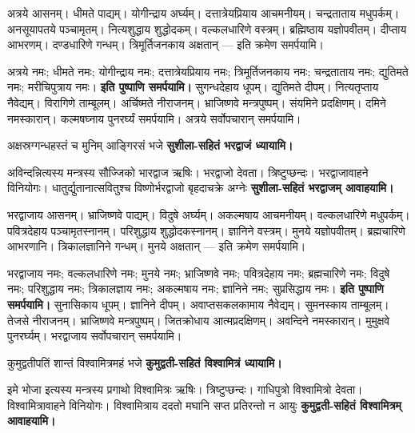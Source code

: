 अत्रये आसनम्। धीमते पाद्यम्। योगीन्द्राय अर्घ्यम्। दत्तात्रेयप्रियाय आचमनीयम्।
चन्द्रताताय मधुपर्कम्। अनसूयापतये पञ्चामृतम्। नित्यशुद्धाय शुद्धोदकम्।
वल्कलधारिणे वस्त्रम्। ब्रह्मिष्ठाय यज्ञोपवीतम्। दीप्ताय आभरणम्। दण्डधारिणे
गन्धम्। त्रिमूर्तिजनकाय अक्षतान् — इति क्रमेण समर्पयामि।

अत्रये नमः; धीमते नमः; योगीन्द्राय नमः; दत्तात्रेयप्रियाय नमः; त्रिमूर्तिजनकाय नमः; चन्द्रताताय नमः; द्युतिमते नमः; मरीचिपुत्राय नमः।
\textbf{इति पुष्पाणि समर्पयामि।} सुगन्धदेहाय धूपम्। द्युतिमते दीपम्।
नित्यतृप्ताय नैवेद्यम्। विरागिणे ताम्बूलम्। अर्चिष्मते नीराजनम्। भ्राजिष्णवे
मन्त्रपुष्पम्। संयमिने प्रदक्षिणम्। दमिने नमस्कारान्। कल्मषघ्नाय पुनरर्घ्यं
समर्पयामि। अत्रये सर्वोपचारान् समर्पयामि।

{अक्षस्रग्गन्धहस्तं च मुनिम् आङ्गिरसं भजे}
\textbf{सुशीला-सहितं भरद्वाजं ध्यायामि।}

अविन्दन्नित्यस्य मन्त्रस्य सौज्जिको भारद्वाज ऋषिः। भरद्वाजो देवता। त्रिष्टुप्छन्दः।
भरद्वाजावाहने विनियोगः।
{धातुर्द्युतानात्सवितुश्च विष्णोर्भरद्वाजो बृहदाचक्रे अग्नेः}
\textbf{सुशीला-सहितं भरद्वाजम् आवाहयामि।}

भरद्वाजाय आसनम्। भ्राजिष्णवे पाद्यम्। विदुषे अर्घ्यम्। अकल्मषाय आचमनीयम्।
वल्कलधारिणे मधुपर्कम्। पवित्रदेहाय पञ्चामृतस्नानम्। परिशुद्धाय
शुद्धोदकस्नानम्। ज्ञानिने वस्त्रम्। मुनये यज्ञोपवीतम्। ब्रह्मचारिणे आभरणानि।
त्रिकालज्ञानिने गन्धम्। मुनये अक्षतान् — इति क्रमेण समर्पयामि।

भरद्वाजाय नमः; वल्कलधारिणे नमः; मुनये नमः; भ्राजिष्णवे नमः; पवित्रदेहाय नमः; ब्रह्मचारिणे नमः; विदुषे नमः; परिशुद्धाय नमः; त्रिकालज्ञाय नमः; अकल्मषाय नमः; ज्ञानिने नमः; सुप्रसिद्धाय नमः।
\textbf{इति पुष्पाणि समर्पयामि।} सुनासिकाय धूपम्। ज्ञानिने दीपम्।
अवाप्तसकलकामाय नैवेद्यम्। सुमनस्काय ताम्बूलम्। तेजसे नीराजनम्। भ्राजिष्णवे
मन्त्रपुष्पम्। जितक्रोधाय आत्मप्रदक्षिणम्। अवन्दिने नमस्कारान्। मुमुक्षवे
पुनरर्घ्यम्। भरद्वाजाय सर्वोपचारान् समर्पयामि।

{कुमुद्वतीपतिं शान्तं विश्वामित्रमहं भजे}
\textbf{कुमुद्वती-सहितं विश्वामित्रं ध्यायामि।}

इमे भोजा इत्यस्य मन्त्रस्य प्रगाथो विश्वामित्रः ऋषिः। त्रिष्टुप्छन्दः। गाधिपुत्रो
विश्वामित्रो देवता। विश्वामित्रावाहने विनियोगः।
{विश्वामित्राय ददतो मघानि सप्त प्रतिरन्तो न आयुः}
\textbf{कुमुद्वती-सहितं विश्वामित्रम् आवाहयामि।}

